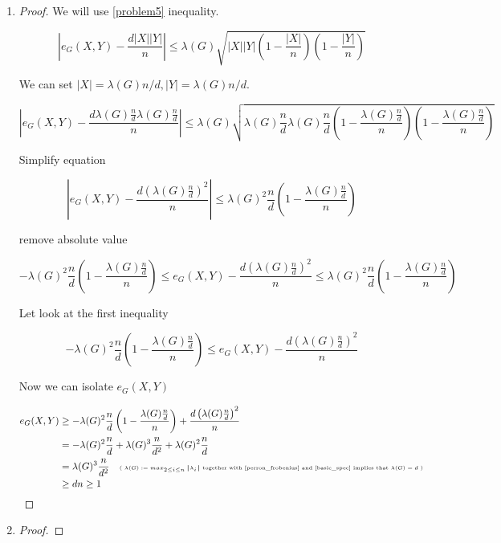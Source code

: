 \documentclass[a4paper, 11pt, oneside]{article}
\newcommand\abs[1]{\left|#1\right|}
\begin{document}
 \begin{enumerate}
 \item
 \begin{proof}
 We will use \ref{problem5} inequality.

\begin{equation*}
\left\lvert  e_G(X,Y) - \frac{d\abs{X}\abs{Y}}{n} \right\rvert \leq \lambda(G) \sqrt{  \abs{X}\abs{Y}  \left( 1 - \frac{\abs{X}}{n} \right)\left( 1 - \frac{\abs{Y}}{n} \right)} 
\end{equation*}	
   
We can set $\abs{X} = \lambda(G)n/d,\abs{Y} = \lambda(G)n/d$.
  
 \begin{equation*}
\left\lvert  e_G(X,Y) - \frac{d\lambda(G)\frac{n}{d}\lambda(G)\frac{n}{d}}{n} \right\rvert \leq \lambda(G) \sqrt{  \lambda(G)\frac{n}{d}\lambda(G)\frac{n}{d}  \left( 1 - \frac{\lambda(G)\frac{n}{d}}{n} \right)\left( 1 - \frac{\lambda(G)\frac{n}{d}}{n} \right)} 
\end{equation*}	

Simplify equation

 \begin{equation*}
\left\lvert  e_G(X,Y) - \frac{d\left(\lambda(G)\frac{n}{d}\right)^2}{n} \right\rvert \leq \lambda(G)^2\frac{n}{d}\left( 1 - \frac{\lambda(G)\frac{n}{d}}{n} \right)
\end{equation*}	

remove absolute value 

\begin{equation*}
-\lambda(G)^2\frac{n}{d}\left( 1 - \frac{\lambda(G)\frac{n}{d}}{n} \right) \leq  e_G(X,Y) - \frac{d\left(\lambda(G)\frac{n}{d}\right)^2}{n} \leq \lambda(G)^2\frac{n}{d}\left( 1 - \frac{\lambda(G)\frac{n}{d}}{n} \right)
\end{equation*}	

Let look at the first inequality

\begin{equation*}
-\lambda(G)^2\frac{n}{d}\left( 1 - \frac{\lambda(G)\frac{n}{d}}{n} \right) \leq  e_G(X,Y) - \frac{d\left(\lambda(G)\frac{n}{d}\right)^2}{n}
\end{equation*}	

Now we can isolate $e_G(X,Y)$

\begin{align*}
e_G(X,Y) & \geq
-\lambda(G)^2\frac{n}{d}\left( 1 - \frac{\lambda(G)\frac{n}{d}}{n} \right) + \frac{d\left(\lambda(G)\frac{n}{d}\right)^2}{n}   \\ &=
-\lambda(G)^2\frac{n}{d} + \lambda(G)^3 \frac{n}{d^2} + \lambda(G)^2 \frac{n}{d} \\&=
 \lambda(G)^3 \frac{n}{d^2} \quad\tiny\text{( $\lambda(G) := max_{2\leq i \leq n}\abs{\lambda_i} $ together with \cite[Theorem 1]{perron_frobenius} and \cite[Lemma 13]{basic_spec} implies that $\lambda(G) = d$ )}  \\&\geq
 d n \geq 1
\end{align*}	
\end{proof}
 \item
  \begin{proof}


\end{proof}
\end{enumerate}
\end{document}
